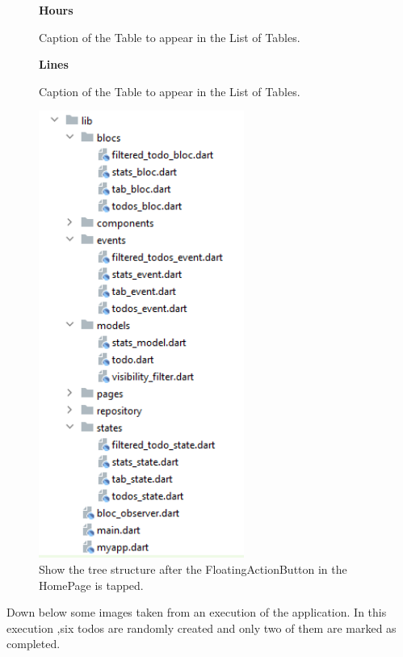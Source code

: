 \begin{figure}[H]
 \caption*{\textbf{Hours}}
\centering
{}
 \caption{Caption of the Table to appear in the List of Tables.}
\end{figure}
\begin{figure}[H]

\caption*{\textbf{Lines}}
\centering
{}
 \caption{Caption of the Table to appear in the List of Tables.}
\end{figure}




\begin{figure}[H]
    \centering
    \includegraphics[width=0.6\textwidth]{Images/struttura_cartelle_bloc.png}
    \caption{Show the tree structure after the FloatingActionButton in the HomePage is tapped.}
    \label{fig:add_todo_page_tree_structure}
\end{figure}
Down below some images taken from an execution of the application. In this execution ,six todos are randomly created and only two of them are marked as completed. 

